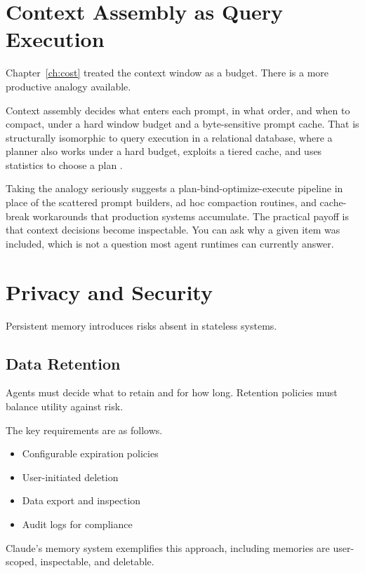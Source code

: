 \section{Context Assembly as Query Execution}

Chapter~\ref{ch:cost} treated the context window as a budget. There is a more
productive analogy available.

Context assembly decides what enters each prompt, in what order, and when to
compact, under a hard window budget and a byte-sensitive prompt cache. That is
structurally isomorphic to query execution in a relational database, where a
planner also works under a hard budget, exploits a tiered cache, and uses
statistics to choose a plan \cite{contextpipe2026}.

Taking the analogy seriously suggests a plan-bind-optimize-execute pipeline in
place of the scattered prompt builders, ad hoc compaction routines, and
cache-break workarounds that production systems accumulate. The practical payoff
is that context decisions become inspectable. You can ask why a given item was
included, which is not a question most agent runtimes can currently answer.

\section{Privacy and Security}

Persistent memory introduces risks absent in stateless systems.

\subsection{Data Retention}

Agents must decide what to retain and for how long. Retention policies must balance utility against risk.

The key requirements are as follows.
\begin{itemize}
\item Configurable expiration policies
\item User-initiated deletion
\item Data export and inspection
\item Audit logs for compliance
\end{itemize}

Claude’s memory system \cite{anthropic2025memory} exemplifies this approach, including memories are user-scoped, inspectable, and deletable.

